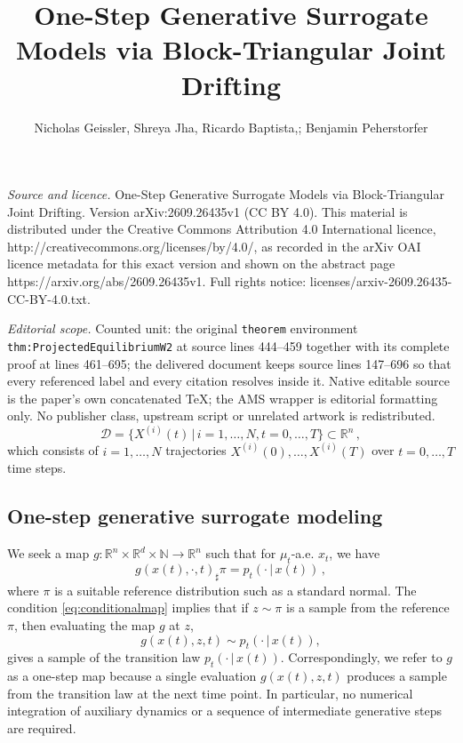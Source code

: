 \documentclass[10pt,a4paper]{amsart}
\newcommand{\R}{\mathbb{R}}
\begin{document}
\title[One-Step Generative Surrogate Models via Block-Triangular Jo]{One-Step Generative Surrogate Models via Block-Triangular Joint Drifting}
\author{Nicholas Geissler, Shreya Jha, Ricardo Baptista,; Benjamin Peherstorfer}
\date{}
\maketitle
\noindent\emph{Source and licence.} One-Step Generative Surrogate Models via Block-Triangular Joint Drifting. Version arXiv:2609.26435v1 (CC BY 4.0). This material is distributed under the Creative Commons Attribution 4.0 International licence, http://creativecommons.org/licenses/by/4.0/, as recorded in the arXiv OAI licence metadata for this exact version and shown on the abstract page https://arxiv.org/abs/2609.26435v1. Full rights notice: licenses/arxiv-2609.26435-CC-BY-4.0.txt.\par\smallskip
\noindent\textit{Editorial scope.} Counted unit: the original \texttt{theorem} environment \texttt{thm:ProjectedEquilibriumW2} at source lines 444--459 together with its complete proof at lines 461--695; the delivered document keeps source lines 147--696 so that every referenced label and every citation resolves inside it. Native editable source is the paper's own concatenated TeX; the AMS wrapper is editorial formatting only. No publisher class, upstream script or unrelated artwork is redistributed.
\begin{equation}\label{eq:data}
\mathcal{D} = \{X^{(i)}(t) \,|\, i = 1, \dots, N, t = 0, \dots, T\} \subset \mathbb{R}^n\,, 
\end{equation}
which consists of $i = 1, \dots, N$ trajectories $X^{(i)}(0), \dots, X^{(i)}(T)$ over $t = 0, \dots, T$ time steps.


\subsection{One-step generative surrogate modeling}
We seek a
    map  $g: \R^n \times \R^d \times \mathbb{N} \to \R^n$ such that for $\mu_t$-a.e. $x_t$, we have
    \begin{equation}\label{eq:conditionalmap}
        g(x(t),\cdot,t)_{\sharp}\pi
        =
        p_t(\cdot\,|\,x(t))\,,
    \end{equation}
    where $\pi$ is a suitable reference distribution such as a standard normal. 
The condition \eqref{eq:conditionalmap} implies that if $z\sim\pi$ is a sample from the reference $\pi$, then evaluating the map $g$ at $z$,
    \[
        g(x(t),z,t) \sim p_t(\cdot\,|\,x(t)),
    \]
    gives a sample of the transition law $p_t(\cdot \,|\, x(t))$. 
Correspondingly, we refer to $g$ as a one-step map because a single evaluation $g(x(t),z,t)$ produces a sample from the transition law at the next time point. In particular, no numerical integration of auxiliary dynamics or a sequence of intermediate generative steps are required.
\end{document}
